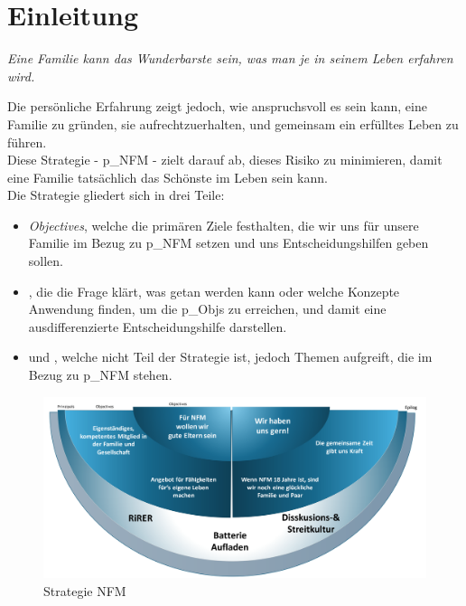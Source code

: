 \section{Einleitung}
\begin{center}
	\textit{Eine Familie kann das Wunderbarste sein, was man je in seinem Leben erfahren wird.}
\end{center}

Die persönliche Erfahrung zeigt jedoch, wie anspruchsvoll es sein kann, eine Familie zu gründen, sie aufrechtzuerhalten, und gemeinsam ein erfülltes Leben zu führen.\\


Diese Strategie - \gls{p_NFM} - zielt darauf ab, dieses Risiko zu minimieren, damit eine Familie tatsächlich das Schönste im Leben sein kann.\\


Die Strategie gliedert sich in drei Teile:
\begin{itemize}
	\item \textit{Objectives}, welche die primären Ziele festhalten, die wir uns für unsere Familie im Bezug zu \gls{p_NFM} setzen und uns Entscheidungshilfen geben sollen.
	\item \textit{}, die die Frage klärt, was getan werden kann oder welche Konzepte Anwendung finden, um die \glspl{p_Obj} zu erreichen, und damit eine ausdifferenzierte Entscheidungshilfe darstellen.
	\item und \textit{}, welche nicht Teil der Strategie ist, jedoch Themen aufgreift, die im Bezug zu \gls{p_NFM} stehen.
\end{itemize}

\begin{figure}[H]
	\centering
	\includegraphics[scale = 0.4]{attachment/chapter_OWN/Scc010.png}
	\caption{Strategie NFM}
\end{figure} 


